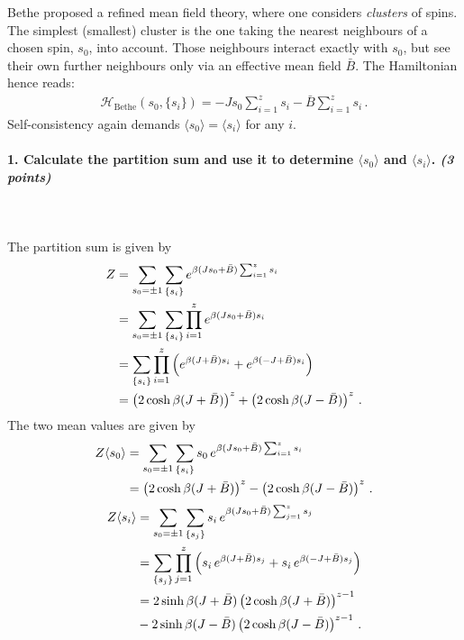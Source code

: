Bethe proposed a refined mean field theory, where one considers \textit{clusters} of spins. The simplest (smallest)
cluster is the one taking the nearest neighbours of a chosen spin, $s_0$, into account. Those neighbours
interact exactly with $s_0$, but see their own further neighbours only via an effective mean field $\bar{B}$. The Hamiltonian hence reads:
\begin{align}
	\mathcal{H}_{\text{Bethe}}(s_0,\{s_i\})=-J s_0\sum_{i=1}^z s_i -\bar{B}\sum_{i=1}^z s_i \,.
\end{align}
Self-consistency again demands $\langle s_0 \rangle = \langle s_i \rangle$ for any $i$.

\paragraph{1. Calculate the partition sum and use it to determine $\langle s_0 \rangle$ and $\langle s_i \rangle$. \textit{(3 points)}
} \ \\
\\
The partition sum is given by
\begin{align}
	Z &= \sum_{s_0=\pm 1} \sum_{\{s_i\}} e^{\beta(Js_0+\bar{B})\sum_{i=1}^z s_i} \notag \\
	&= \sum_{s_0=\pm 1} \sum_{\{s_i\}} \prod_{i=1}^z e^{\beta(Js_0+\bar{B}) s_i} \notag \\
	&= \sum_{\{s_i\}} \prod_{i=1}^z \left( e^{\beta(J+\bar{B}) s_i} + e^{\beta(-J+\bar{B}) s_i} \right) \notag \\
	&= \left( 2\cosh\beta(J+\bar{B}) \right)^z + \left( 2\cosh\beta(J-\bar{B}) \right)^z \,.
\end{align}
The two mean values are given by
\begin{align}
	Z \langle s_0 \rangle &= \sum_{s_0=\pm 1} \sum_{\{s_i\}} s_0 \, e^{\beta(Js_0+\bar{B})\sum_{i=1}^z s_i} \notag \\
	&= \left( 2\cosh\beta(J+\bar{B}) \right)^z - \left( 2\cosh\beta(J-\bar{B}) \right)^z \,.
\end{align}
\begin{align}
	Z \langle s_i \rangle &= \sum_{s_0=\pm 1} \sum_{\{s_j\}} s_i \, e^{\beta(Js_0+\bar{B})\sum_{j=1}^z s_j} \notag \\
	&= \sum_{\{s_j\}} \prod_{j=1}^z \left( s_i \, e^{\beta(J+\bar{B}) s_j} + s_i \, e^{\beta(-J+\bar{B}) s_j} \right) \notag \\
	&= 2\sinh\beta(J+\bar{B})\left( 2\cosh\beta(J+\bar{B}) \right)^{z-1} \notag \\
	&- 2\sinh\beta(J-\bar{B})\left( 2\cosh\beta(J-\bar{B}) \right)^{z-1} \,.
\end{align}


